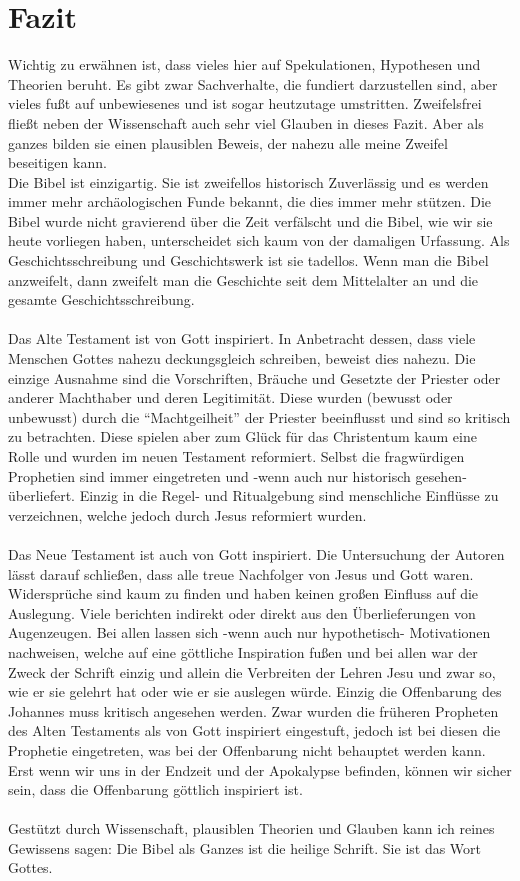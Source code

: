 \chapter{Fazit}
Wichtig zu erwähnen ist, dass vieles hier auf Spekulationen, Hypothesen und Theorien beruht. Es gibt zwar Sachverhalte, die fundiert darzustellen sind, aber vieles fußt auf unbewiesenes und ist sogar heutzutage umstritten. Zweifelsfrei fließt neben der Wissenschaft auch sehr viel Glauben in dieses Fazit. Aber als ganzes bilden sie einen plausiblen Beweis, der nahezu alle meine Zweifel beseitigen kann.
\\
Die Bibel ist einzigartig. Sie ist zweifellos historisch Zuverlässig und es werden immer mehr archäologischen Funde bekannt, die dies immer mehr stützen. Die Bibel wurde nicht gravierend über die Zeit verfälscht und die Bibel, wie wir sie heute vorliegen haben, unterscheidet sich kaum von der damaligen Urfassung. Als Geschichtsschreibung und Geschichtswerk ist sie tadellos. Wenn man die Bibel anzweifelt, dann zweifelt man die Geschichte seit dem Mittelalter an und die gesamte Geschichtsschreibung.
\\~\\
Das Alte Testament ist von Gott inspiriert. In Anbetracht dessen, dass viele Menschen Gottes nahezu deckungsgleich schreiben, beweist dies nahezu. Die einzige Ausnahme sind die Vorschriften, Bräuche und Gesetzte der Priester oder anderer Machthaber und deren Legitimität. Diese wurden (bewusst oder unbewusst) durch die ``Machtgeilheit'' der Priester beeinflusst und sind so kritisch zu betrachten. Diese spielen aber zum Glück für das Christentum kaum eine Rolle und wurden im neuen Testament reformiert. Selbst die fragwürdigen Prophetien sind immer eingetreten und -wenn auch nur historisch gesehen- überliefert. Einzig in die Regel- und Ritualgebung sind menschliche Einflüsse zu verzeichnen, welche jedoch durch Jesus reformiert wurden.
\\~\\
Das Neue Testament ist auch von Gott inspiriert. Die Untersuchung der Autoren lässt darauf schließen, dass alle treue Nachfolger von Jesus und Gott waren. Widersprüche sind kaum zu finden und haben keinen großen Einfluss auf die Auslegung. Viele berichten indirekt oder direkt aus den Überlieferungen von Augenzeugen. Bei allen lassen sich -wenn auch nur hypothetisch- Motivationen nachweisen, welche auf eine göttliche Inspiration fußen und bei allen war der Zweck der Schrift einzig und allein die Verbreiten der Lehren Jesu und zwar so, wie er sie gelehrt hat oder wie er sie auslegen würde. Einzig die Offenbarung des Johannes muss kritisch angesehen werden. Zwar wurden die früheren Propheten des Alten Testaments als von Gott inspiriert eingestuft, jedoch ist bei diesen die Prophetie eingetreten, was bei der Offenbarung nicht behauptet werden kann. Erst wenn wir uns in der Endzeit und der Apokalypse befinden, können wir sicher sein, dass die Offenbarung göttlich inspiriert ist.
\\~\\
Gestützt durch Wissenschaft, plausiblen Theorien und Glauben kann ich reines Gewissens sagen: Die Bibel als Ganzes ist die heilige Schrift. Sie ist das Wort Gottes.
